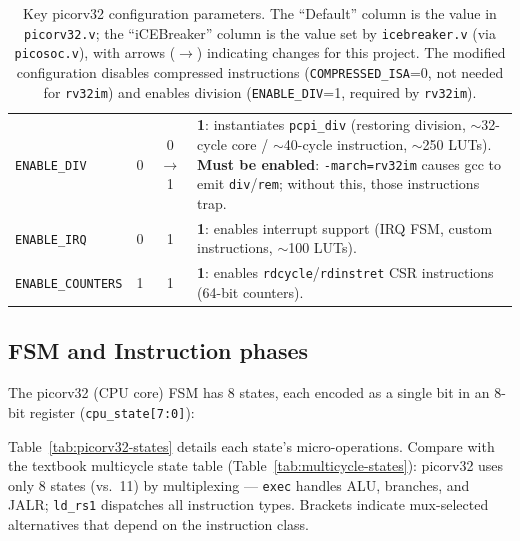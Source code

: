 \documentclass[9pt, a4paper]{extarticle}
\begin{document}
\begin{table}[htbp]
\begin{tabular}{@{}l c c p{7.5cm}@{}}
    \texttt{ENABLE\_DIV} & 0 & 0 $\to$ 1 &
        \textbf{1}: instantiates \texttt{pcpi\_div} (restoring division, $\sim$32-cycle core / $\sim$40-cycle instruction, $\sim$250 LUTs). \textbf{Must be enabled}: \texttt{-march=rv32im} causes gcc to emit \texttt{div}/\texttt{rem}; without this, those instructions trap. \\
    \texttt{ENABLE\_IRQ} & 0 & 1 &
        \textbf{1}: enables interrupt support (IRQ FSM, custom instructions, $\sim$100 LUTs). \\
    \texttt{ENABLE\_COUNTERS} & 1 & 1 &
        \textbf{1}: enables \texttt{rdcycle}/\texttt{rdinstret} CSR instructions (64-bit counters). \\
    \bottomrule
\end{tabular}
\caption{Key picorv32 configuration parameters. The ``Default'' column is the value in \texttt{picorv32.v}; the ``iCEBreaker'' column is the value set by \texttt{icebreaker.v} (via \texttt{picosoc.v}), with arrows ($\to$) indicating changes for this project. The modified configuration disables compressed instructions (\texttt{COMPRESSED\_ISA}=0, not needed for \texttt{rv32im}) and enables division (\texttt{ENABLE\_DIV}=1, required by \texttt{rv32im}).}
\label{tab:picorv32-params}
\end{table}

\newpage

\subsection{FSM and Instruction phases}

The picorv32 (CPU core) FSM has 8 states, each encoded as a single bit in an 8-bit register (\texttt{cpu\_state[7:0]}):

Table~\ref{tab:picorv32-states} details each state's micro-operations. Compare with the textbook multicycle state table (Table~\ref{tab:multicycle-states}): picorv32 uses only 8 states (vs.\ 11) by multiplexing --- \texttt{exec} handles ALU, branches, and JALR; \texttt{ld\_rs1} dispatches all instruction types. Brackets indicate mux-selected alternatives that depend on the instruction class.
\end{document}
